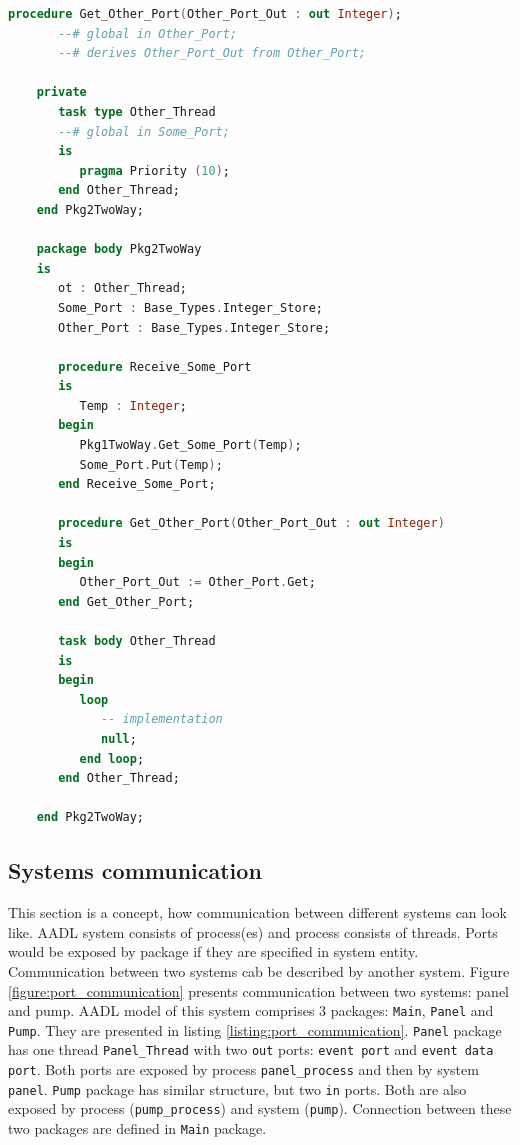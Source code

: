 \begin{lstlisting}[language=ada, frame=single, gobble=0, caption={Two way port communication translated to SPARK Ada}]
	   procedure Get_Other_Port(Other_Port_Out : out Integer);
	   --# global in Other_Port;
	   --# derives Other_Port_Out from Other_Port;

	private
	   task type Other_Thread
	   --# global in Some_Port;
	   is
	      pragma Priority (10);
	   end Other_Thread;
	end Pkg2TwoWay;

	package body Pkg2TwoWay
	is
	   ot : Other_Thread;
	   Some_Port : Base_Types.Integer_Store;
	   Other_Port : Base_Types.Integer_Store;
	   
	   procedure Receive_Some_Port
	   is
	      Temp : Integer;
	   begin
	      Pkg1TwoWay.Get_Some_Port(Temp);
	      Some_Port.Put(Temp);
	   end Receive_Some_Port;   
	   
	   procedure Get_Other_Port(Other_Port_Out : out Integer)
	   is
	   begin
	      Other_Port_Out := Other_Port.Get;
	   end Get_Other_Port;
	   
	   task body Other_Thread
	   is   
	   begin      
	      loop         
	         -- implementation
	         null;         
	      end loop;      
	   end Other_Thread;

	end Pkg2TwoWay;
\end{lstlisting} 
\label{listing:port_communication_thread_two_way_spark}
\doublespacing


\subsection{Systems communication}
\label{codegen:port_communication:system}

This section is a concept, how communication between different systems can look like. AADL system consists of process(es) and process consists of threads. Ports would be exposed by package if they are specified in system entity. Communication between two systems cab be described by another system. Figure \ref{figure:port_communication} presents communication between two systems: panel and pump. AADL model of this system comprises 3 packages: \lstinline{Main}, \lstinline{Panel} and \lstinline{Pump}. They are presented in listing \ref{listing:port_communication}. \lstinline{Panel} package has one thread \lstinline{Panel_Thread} with two \lstinline{out} ports: \lstinline{event port} and \lstinline{event data port}. Both ports are exposed by process \lstinline{panel_process} and then by system \lstinline{panel}. \lstinline{Pump} package has similar structure, but two \lstinline{in} ports. Both are also exposed by process (\lstinline{pump_process}) and system (\lstinline{pump}). Connection between these two packages are defined in \lstinline{Main} package.

